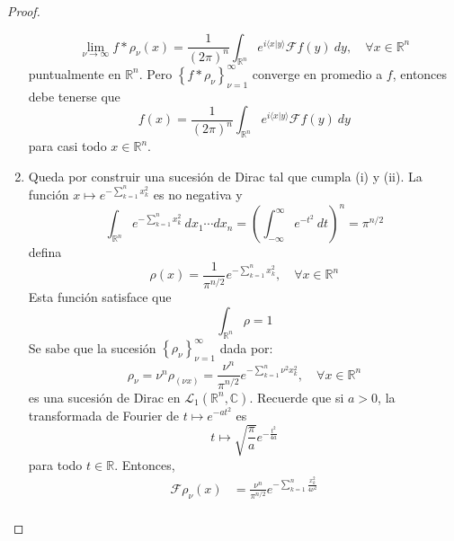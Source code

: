 \documentclass[12pt]{report}
\theoremstyle{largebreak}
\newcommand\pint[2]{\ensuremath{\langle#1| #2\rangle}}
\newcommand{\fou}[1]{\ensuremath{\mathcal{F}#1}}
\begin{document}
\begin{proof}
\begin{enumerate}
\begin{equation*}
                \lim_{ \nu\rightarrow\infty}f*\rho_\nu(x)=\frac{1}{(2\pi)^n}\int_{\mathbb{R}^n}e^{ i\pint{x}{y}}\fou{f}(y)\:dy,\quad\forall x\in\mathbb{R}^n
            \end{equation*}
            puntualmente en $\mathbb{R}^n$. Pero $\left\{f*\rho_\nu \right\}_{\nu=1}^\infty$ converge en promedio a $f$, entonces debe tenerse que
            \begin{equation*}
                f(x)=\frac{1}{(2\pi)^n}\int_{\mathbb{R}^n}e^{ i\pint{x}{y}}\fou{f}(y)\:dy
            \end{equation*}
            para casi todo $x\in\mathbb{R}^n$.
            \item Queda por construir una sucesión de Dirac tal que cumpla (i) y (ii). La función $x\mapsto e^{-\sum_{ k=1}^n x_k^2}$ es no negativa y
            \begin{equation*}
                \int_{\mathbb{R}^n}e^{ -\sum_{ k=1}^n x_k^2}\:dx_1\cdots dx_n=\left(\int_{-\infty}^\infty e^{ -t^2}\:dt\right)^n=\pi^{ n/2}
            \end{equation*}
            defina
            \begin{equation*}
                \rho(x)=\frac{1}{\pi^{ n/2}}e^{-\sum_{ k=1}^n x_k^2},\quad\forall x\in\mathbb{R}^n
            \end{equation*}
            Esta función satisface que
            \begin{equation*}
                \int_{\mathbb{R}^n}\rho=1
            \end{equation*}
            Se sabe que la sucesión $\left\{\rho_\nu\right\}_{\nu=1}^\infty$ dada por:
            \begin{equation*}
                \rho_\nu=\nu^n \rho_(\nu x)=\frac{\nu^n}{\pi^{ n/2}}e^{-\sum_{ k=1}^n \nu^2 x_k^2},\quad\forall x\in\mathbb{R}^n
            \end{equation*}
            es una sucesión de Dirac en $\mathcal{L}_1(\mathbb{R}^n,\mathbb{C})$. Recuerde que si $a>0$, la transformada de Fourier de $t\mapsto e^{ -at^2}$ es
            \begin{equation*}
                t\mapsto\sqrt{\frac{\pi}{a}}e^{-\frac{t^2}{4a}}
            \end{equation*}
            para todo $t\in\mathbb{R}$. Entonces,
            \begin{equation*}
                \begin{split}
                    \fou{\rho_\nu}(x)&=\frac{\nu^n}{\pi^{ n/2}}e^{ -\sum_{ k=1}^n \frac{x_k^2}{4\nu^2}}\\

\end{split}
\end{equation*}
\end{enumerate}
\end{proof}
\end{document}
